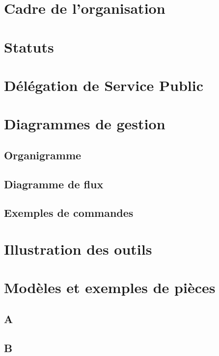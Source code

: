 \section{Cadre de l'organisation}
\section{Statuts}
\section{Délégation de Service Public}
\section{Diagrammes de gestion}
\subsection{Organigramme}
\subsection{Diagramme de flux}
\subsection{Exemples de commandes}
\section{Illustration des outils}
\section{Modèles et exemples de pièces}
\subsection{A}
\subsection{B}

